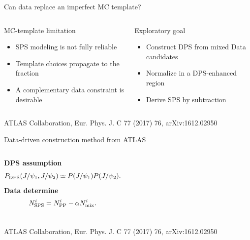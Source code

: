 \documentclass[11pt,aspectratio=169]{beamer}
\newcommand{\atlasref}{\textcolor{neutral}{\scriptsize ATLAS Collaboration, Eur. Phys. J. C 77 (2017) 76, arXiv:1612.02950}}
\begin{document}
\begin{frame}[plain]\titlepage\end{frame}

\begin{frame}{Can data replace an imperfect MC template?}
\begin{columns}[T]\begin{block}{MC-template limitation}\begin{itemize}\item SPS modeling is not fully reliable\item Template choices propagate to the fraction\item A complementary data constraint is desirable\end{itemize}\end{block}
\begin{exampleblock}{Exploratory goal}\begin{itemize}\item Construct DPS from mixed Data candidates\item Normalize in a DPS-enhanced region\item Derive SPS by subtraction\end{itemize}\end{exampleblock}\end{columns}
\vfill\centering{}\vfill\atlasref
\end{frame}

\begin{frame}{Data-driven construction method from ATLAS}
\centering{}
\vspace{.55cm}\begin{columns}[T]\textbf{DPS assumption}\[P_{\rm DPS}(J/\psi_1,J/\psi_2)\simeq P(J/\psi_1)P(J/\psi_2).\]
\textbf{Data determine}\[N_{\rm SPS}^i=N_{\rm PP}^i-\alpha N_{\rm mix}^i.\]\end{columns}\vfill\atlasref
\end{frame}
\end{document}
